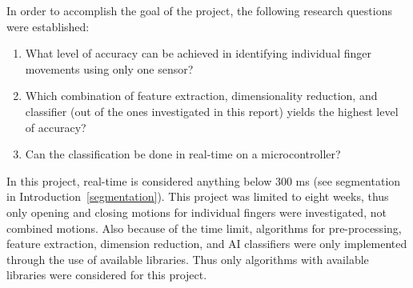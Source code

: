 
\label{section:research questions}
In order to accomplish the goal of the project, the following research questions were established:
\begin{enumerate}
    \item What level of accuracy can be achieved in identifying individual finger movements using only one sensor?
    \item Which combination of feature extraction, dimensionality reduction, and classifier (out of the ones investigated in this report) yields the highest level of accuracy?
    \item Can the classification be done in real-time on a microcontroller?
\end{enumerate}
In this project, real-time is considered anything below 300 ms (see segmentation in Introduction~\ref{segmentation}).
This project was limited to eight weeks, thus only opening and closing motions for individual fingers were investigated, not combined motions. Also because of the time limit, algorithms for pre-processing, feature extraction, dimension reduction, and AI classifiers were only implemented through the use of available libraries. Thus only algorithms with available libraries were considered for this project.









